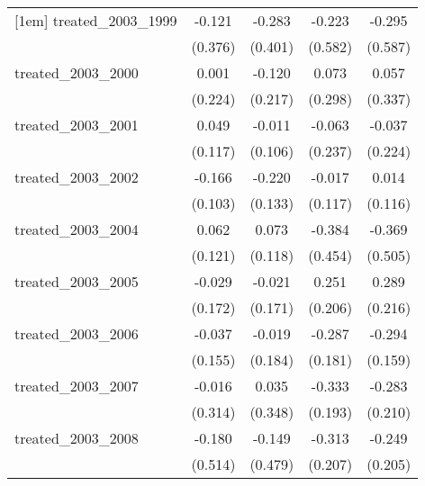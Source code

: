 {\begin{tabular}{l*{4}{c}}
[1em]
treated\_2003\_1999&      -0.121         &      -0.283         &      -0.223         &      -0.295         \\
            &     (0.376)         &     (0.401)         &     (0.582)         &     (0.587)         \\
[1em]
treated\_2003\_2000&       0.001         &      -0.120         &       0.073         &       0.057         \\
            &     (0.224)         &     (0.217)         &     (0.298)         &     (0.337)         \\
[1em]
treated\_2003\_2001&       0.049         &      -0.011         &      -0.063         &      -0.037         \\
            &     (0.117)         &     (0.106)         &     (0.237)         &     (0.224)         \\
[1em]
treated\_2003\_2002&      -0.166         &      -0.220         &      -0.017         &       0.014         \\
            &     (0.103)         &     (0.133)         &     (0.117)         &     (0.116)         \\
[1em]
treated\_2003\_2004&       0.062         &       0.073         &      -0.384         &      -0.369         \\
            &     (0.121)         &     (0.118)         &     (0.454)         &     (0.505)         \\
[1em]
treated\_2003\_2005&      -0.029         &      -0.021         &       0.251         &       0.289         \\
            &     (0.172)         &     (0.171)         &     (0.206)         &     (0.216)         \\
[1em]
treated\_2003\_2006&      -0.037         &      -0.019         &      -0.287         &      -0.294         \\
            &     (0.155)         &     (0.184)         &     (0.181)         &     (0.159)         \\
[1em]
treated\_2003\_2007&      -0.016         &       0.035         &      -0.333         &      -0.283         \\
            &     (0.314)         &     (0.348)         &     (0.193)         &     (0.210)         \\
[1em]
treated\_2003\_2008&      -0.180         &      -0.149         &      -0.313         &      -0.249         \\
            &     (0.514)         &     (0.479)         &     (0.207)         &     (0.205)         \\

\end{tabular}}
